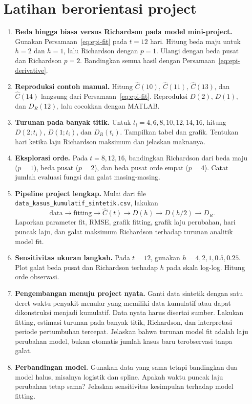 \documentclass[book,english,noindex,lean,nobackpage,nocopyright,noupdate,nofiglist,notablist]{enacom}
\begin{document}
\section{Latihan berorientasi project}
\begin{enumerate}
\item \textbf{Beda hingga biasa versus Richardson pada model mini-project.}
Gunakan Persamaan~\eqref{eq:epi-fit} pada $t=12$ hari. Hitung beda maju untuk $h=2$ dan $h=1$, lalu Richardson dengan $p=1$. Ulangi dengan beda pusat dan Richardson $p=2$. Bandingkan semua hasil dengan Persamaan~\eqref{eq:epi-derivative}.

\item \textbf{Reproduksi contoh manual.}
Hitung $\widehat C(10)$, $\widehat C(11)$, $\widehat C(13)$, dan $\widehat C(14)$ langsung dari Persamaan~\eqref{eq:epi-fit}. Reproduksi $D(2)$, $D(1)$, dan $D_R(12)$, lalu cocokkan dengan MATLAB.

\item \textbf{Turunan pada banyak titik.}
Untuk $t_i=4,6,8,10,12,14,16$, hitung $D(2;t_i)$, $D(1;t_i)$, dan $D_R(t_i)$. Tampilkan tabel dan grafik. Tentukan hari ketika laju Richardson maksimum dan jelaskan maknanya.

\item \textbf{Eksplorasi orde.}
Pada $t=8,12,16$, bandingkan Richardson dari beda maju ($p=1$), beda pusat ($p=2$), dan beda pusat orde empat ($p=4$). Catat jumlah evaluasi fungsi dan galat masing-masing.

\item \textbf{Pipeline project lengkap.}
Mulai dari file \texttt{data\_kasus\_kumulatif\_sintetik.csv}, lakukan
\[
\text{data}\rightarrow\text{fitting}\rightarrow
\widehat C(t)\rightarrow D(h)\rightarrow D(h/2)\rightarrow D_R.
\]
Laporkan parameter fit, RMSE, grafik fitting, grafik laju perubahan, hari puncak laju, dan galat maksimum Richardson terhadap turunan analitik model fit.

\item \textbf{Sensitivitas ukuran langkah.}
Pada $t=12$, gunakan $h=4,2,1,0.5,0.25$. Plot galat beda pusat dan Richardson terhadap $h$ pada skala log-log. Hitung orde observasi.

\item \textbf{Pengembangan menuju project nyata.}
Ganti data sintetik dengan satu deret waktu penyakit menular yang memiliki data kumulatif atau dapat dikonstruksi menjadi kumulatif. Data nyata harus disertai sumber. Lakukan fitting, estimasi turunan pada banyak titik, Richardson, dan interpretasi periode pertumbuhan tercepat. Jelaskan bahwa turunan model fit adalah laju perubahan model, bukan otomatis jumlah kasus baru terobservasi tanpa galat.

\item \textbf{Perbandingan model.}
Gunakan data yang sama tetapi bandingkan dua model halus, misalnya logistik dan spline. Apakah waktu puncak laju perubahan tetap sama? Jelaskan sensitivitas kesimpulan terhadap model fitting.
\end{enumerate}
\end{document}
